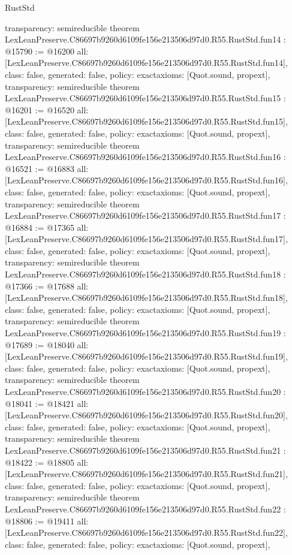 \begin{lexlean}{RustStd}
\begin{coremodule}
{  transparency: semireducible
}
theorem LexLeanPreserve.C86697b9260d6109fe156e213506d97d0.R55.RustStd.fun14 : @15790 := @16200 {
  all: [LexLeanPreserve.C86697b9260d6109fe156e213506d97d0.R55.RustStd.fun14],
  class: false,
  generated: false,
  policy: exact{axioms: [Quot.sound, propext]},
  transparency: semireducible
}
theorem LexLeanPreserve.C86697b9260d6109fe156e213506d97d0.R55.RustStd.fun15 : @16201 := @16520 {
  all: [LexLeanPreserve.C86697b9260d6109fe156e213506d97d0.R55.RustStd.fun15],
  class: false,
  generated: false,
  policy: exact{axioms: [Quot.sound, propext]},
  transparency: semireducible
}
theorem LexLeanPreserve.C86697b9260d6109fe156e213506d97d0.R55.RustStd.fun16 : @16521 := @16883 {
  all: [LexLeanPreserve.C86697b9260d6109fe156e213506d97d0.R55.RustStd.fun16],
  class: false,
  generated: false,
  policy: exact{axioms: [Quot.sound, propext]},
  transparency: semireducible
}
theorem LexLeanPreserve.C86697b9260d6109fe156e213506d97d0.R55.RustStd.fun17 : @16884 := @17365 {
  all: [LexLeanPreserve.C86697b9260d6109fe156e213506d97d0.R55.RustStd.fun17],
  class: false,
  generated: false,
  policy: exact{axioms: [Quot.sound, propext]},
  transparency: semireducible
}
theorem LexLeanPreserve.C86697b9260d6109fe156e213506d97d0.R55.RustStd.fun18 : @17366 := @17688 {
  all: [LexLeanPreserve.C86697b9260d6109fe156e213506d97d0.R55.RustStd.fun18],
  class: false,
  generated: false,
  policy: exact{axioms: [Quot.sound, propext]},
  transparency: semireducible
}
theorem LexLeanPreserve.C86697b9260d6109fe156e213506d97d0.R55.RustStd.fun19 : @17689 := @18040 {
  all: [LexLeanPreserve.C86697b9260d6109fe156e213506d97d0.R55.RustStd.fun19],
  class: false,
  generated: false,
  policy: exact{axioms: [Quot.sound, propext]},
  transparency: semireducible
}
theorem LexLeanPreserve.C86697b9260d6109fe156e213506d97d0.R55.RustStd.fun20 : @18041 := @18421 {
  all: [LexLeanPreserve.C86697b9260d6109fe156e213506d97d0.R55.RustStd.fun20],
  class: false,
  generated: false,
  policy: exact{axioms: [Quot.sound, propext]},
  transparency: semireducible
}
theorem LexLeanPreserve.C86697b9260d6109fe156e213506d97d0.R55.RustStd.fun21 : @18422 := @18805 {
  all: [LexLeanPreserve.C86697b9260d6109fe156e213506d97d0.R55.RustStd.fun21],
  class: false,
  generated: false,
  policy: exact{axioms: [Quot.sound, propext]},
  transparency: semireducible
}
theorem LexLeanPreserve.C86697b9260d6109fe156e213506d97d0.R55.RustStd.fun22 : @18806 := @19411 {
  all: [LexLeanPreserve.C86697b9260d6109fe156e213506d97d0.R55.RustStd.fun22],
  class: false,
  generated: false,
  policy: exact{axioms: [Quot.sound, propext]},
}
\end{coremodule}
\end{lexlean}
